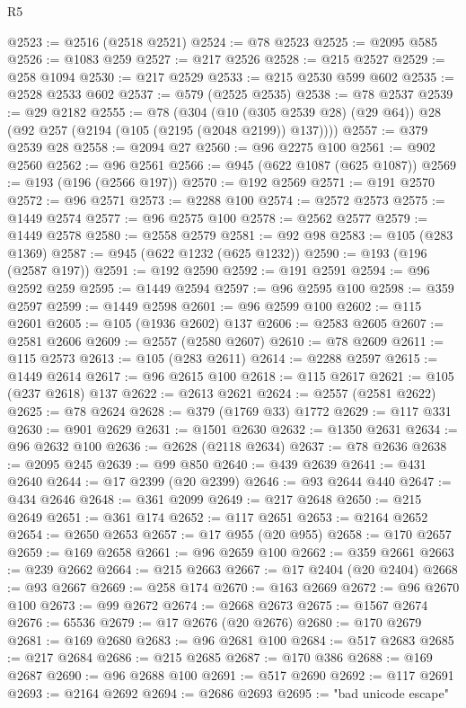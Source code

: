 \begin{lexlean}{R5}
\begin{coremodule}
@2523 := @2516 (@2518 @2521)
@2524 := @78 @2523
@2525 := @2095 @585
@2526 := @1083 @259
@2527 := @217 @2526
@2528 := @215 @2527
@2529 := @258 @1094
@2530 := @217 @2529
@2533 := @215 @2530 @599 @602
@2535 := @2528 @2533 @602
@2537 := @579 (@2525 @2535)
@2538 := @78 @2537
@2539 := @29 @2182
@2555 := @78
    (@304 (@10 (@305 @2539 @28) (@29 @64)) @28 (@92 @257 (@2194 (@105 (@2195 (@2048 @2199)) @137))))
@2557 := @379 @2539 @28
@2558 := @2094 @27
@2560 := @96 @2275 @100
@2561 := @902 @2560
@2562 := @96 @2561
@2566 := @945 (@622 @1087 (@625 @1087))
@2569 := @193 (@196 (@2566 @197))
@2570 := @192 @2569
@2571 := @191 @2570
@2572 := @96 @2571
@2573 := @2288 @100
@2574 := @2572 @2573
@2575 := @1449 @2574
@2577 := @96 @2575 @100
@2578 := @2562 @2577
@2579 := @1449 @2578
@2580 := @2558 @2579
@2581 := @92 @98
@2583 := @105 (@283 @1369)
@2587 := @945 (@622 @1232 (@625 @1232))
@2590 := @193 (@196 (@2587 @197))
@2591 := @192 @2590
@2592 := @191 @2591
@2594 := @96 @2592 @259
@2595 := @1449 @2594
@2597 := @96 @2595 @100
@2598 := @359 @2597
@2599 := @1449 @2598
@2601 := @96 @2599 @100
@2602 := @115 @2601
@2605 := @105 (@1936 @2602) @137
@2606 := @2583 @2605
@2607 := @2581 @2606
@2609 := @2557 (@2580 @2607)
@2610 := @78 @2609
@2611 := @115 @2573
@2613 := @105 (@283 @2611)
@2614 := @2288 @2597
@2615 := @1449 @2614
@2617 := @96 @2615 @100
@2618 := @115 @2617
@2621 := @105 (@237 @2618) @137
@2622 := @2613 @2621
@2624 := @2557 (@2581 @2622)
@2625 := @78 @2624
@2628 := @379 (@1769 @33) @1772
@2629 := @117 @331
@2630 := @901 @2629
@2631 := @1501 @2630
@2632 := @1350 @2631
@2634 := @96 @2632 @100
@2636 := @2628 (@2118 @2634)
@2637 := @78 @2636
@2638 := @2095 @245
@2639 := @99 @850
@2640 := @439 @2639
@2641 := @431 @2640
@2644 := @17 @2399 (@20 @2399)
@2646 := @93 @2644 @440
@2647 := @434 @2646
@2648 := @361 @2099
@2649 := @217 @2648
@2650 := @215 @2649
@2651 := @361 @174
@2652 := @117 @2651
@2653 := @2164 @2652
@2654 := @2650 @2653
@2657 := @17 @955 (@20 @955)
@2658 := @170 @2657
@2659 := @169 @2658
@2661 := @96 @2659 @100
@2662 := @359 @2661
@2663 := @239 @2662
@2664 := @215 @2663
@2667 := @17 @2404 (@20 @2404)
@2668 := @93 @2667
@2669 := @258 @174
@2670 := @163 @2669
@2672 := @96 @2670 @100
@2673 := @99 @2672
@2674 := @2668 @2673
@2675 := @1567 @2674
@2676 := 65536
@2679 := @17 @2676 (@20 @2676)
@2680 := @170 @2679
@2681 := @169 @2680
@2683 := @96 @2681 @100
@2684 := @517 @2683
@2685 := @217 @2684
@2686 := @215 @2685
@2687 := @170 @386
@2688 := @169 @2687
@2690 := @96 @2688 @100
@2691 := @517 @2690
@2692 := @117 @2691
@2693 := @2164 @2692
@2694 := @2686 @2693
@2695 := "bad unicode escape"

\end{coremodule}
\end{lexlean}
